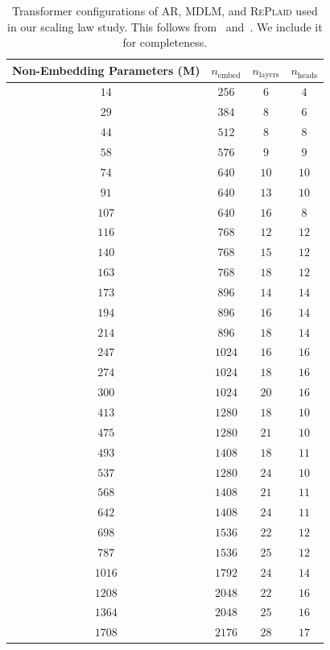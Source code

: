 \documentclass{article}
\begin{document}
\begin{table}[H]
    \centering
    \caption{\small Transformer configurations of AR, MDLM, and \textsc{RePlaid} used in our scaling law study. This follows from~\citet{nie2025scaling} and~\citet{sahoo2026scaling}. We include it for completeness.} 
    \vspace{1em}
    \label{tab:model_sizes}
    \begin{tabular}{c|ccc}
    Non-Embedding Parameters (M) & $n_\text{embed}$ &  $n_\text{layers}$ & $n_\text{heads}$ \\
    \toprule
    $14$ & $256$ & $6$ & $4$ \\
    $29$ & $384$ & $8$ & $6$ \\
    $44$ & $512$ & $8$ & $8$ \\
    $58$ & $576$ & $9$ & $9$ \\
    $74$ & $640$ & $10$ & $10$ \\
    $91$ & $640$ & $13$ & $10$ \\
    $107$ & $640$ & $16$ & $8$ \\
    $116$ & $768$ & $12$ & $12$ \\
    $140$ & $768$ & $15$ & $12$ \\
    $163$ & $768$ & $18$ & $12$ \\
    $173$ & $896$ & $14$ & $14$ \\
    $194$ & $896$ & $16$ & $14$ \\
    $214$ & $896$ & $18$ & $14$ \\
    $247$ & $1024$ & $16$ & $16$ \\
    $274$ & $1024$ & $18$ & $16$ \\
    $300$ & $1024$ & $20$ & $16$ \\
    $413$ & $1280$ & $18$ & $10$ \\
    $475$ & $1280$ & $21$ & $10$ \\
    $493$ & $1408$ & $18$ & $11$ \\
    $537$ & $1280$ & $24$ & $10$ \\
    $568$ & $1408$ & $21$ & $11$ \\
    $642$ & $1408$ & $24$ & $11$ \\
    $698$ & $1536$ & $22$ & $12$ \\
    $787$ & $1536$ & $25$ & $12$ \\
    $1016$ & $1792$ & $24$ & $14$ \\
    $1208$ & $2048$ & $22$ & $16$ \\
    $1364$ & $2048$ & $25$ & $16$ \\
    $1708$ & $2176$ & $28$ & $17$ \\
    \bottomrule
    \end{tabular}
\end{table}
\end{document}
